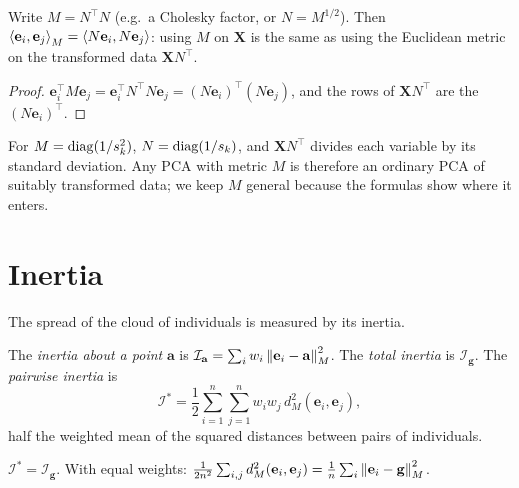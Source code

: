 \begin{notechapter}
\begin{proposition}\label{pca-overview:prop:N}
Write $M = N^\top N$ (e.g.\ a Cholesky factor, or $N = M^{1/2}$). Then
$\left\langle \mathbf e_i, \mathbf e_j \right\rangle_M = \left\langle N\mathbf e_i, N\mathbf e_j \right\rangle$: using $M$ on $\mathbf X$ is the same as
using the Euclidean metric on the transformed data $\mathbf X N^\top$.
\end{proposition}

\begin{proof}
$\mathbf e_i^\top M\mathbf e_j = \mathbf e_i^\top N^\top N\mathbf e_j = (N\mathbf e_i)^\top(N\mathbf e_j)$, and the rows of
$\mathbf XN^\top$ are the $(N\mathbf e_i)^\top$.
\end{proof}

For $M = \operatorname{diag}(1/s_k^2)$, $N = \operatorname{diag}(1/s_k)$, and $\mathbf XN^\top$ divides each variable by its
standard deviation. Any PCA with metric $M$ is therefore an ordinary PCA of suitably
transformed data; we keep $M$ general because the formulas show where it enters.

\section{Inertia}\label{pca-overview:sec:inertia}

The spread of the cloud of individuals is measured by its inertia.

\begin{definition}[Inertia]
The \emph{inertia about a point} $\mathbf a$ is $\mathcal I_{\mathbf a} = \sum_iw_i\left\|\mathbf e_i - \mathbf a\right\|_M^2$.
The \emph{total inertia} is $\mathcal I_{\mathbf g}$. The \emph{pairwise inertia} is
\[
  \mathcal I^* = \frac12\sum_{i=1}^n\sum_{j=1}^nw_iw_j\,d_M^2(\mathbf e_i,\mathbf e_j),
\]
half the weighted mean of the squared distances between pairs of individuals.
\end{definition}

\begin{proposition}\label{pca-overview:prop:pairwise}
$\mathcal I^* = \mathcal I_{\mathbf g}$. With equal weights:
$\frac1{2n^2}\sum_{i,j}d_M^2(\mathbf e_i,\mathbf e_j) = \frac1n\sum_i\left\|\mathbf e_i - \mathbf g\right\|_M^2$.
\end{proposition}


\end{notechapter}
